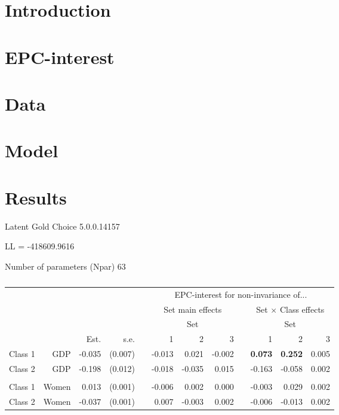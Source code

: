 \documentclass[letterpaper,12pt]{article}
\begin{document}
\section{Introduction}

\noindent


\section{EPC-interest}

\section{Data}
\section{Model}
\section{Results}

Latent Gold Choice 5.0.0.14157

LL = -418609.9616

Number of parameters (Npar)	63


\begin{table}
	\begin{tabular}{lrrrrrrrrrrr}
	\hline
		&&&&&\multicolumn{7}{c}{EPC-interest for non-invariance of...}\\
	&&&&&\multicolumn{3}{c}{Set main effects} && \multicolumn{3}{c}{Set $\times$ Class effects}\\
			\hline
		&&&&&\multicolumn{3}{c}{Set} && \multicolumn{3}{c}{Set}\\
\cline{6-8}\cline{10-12}
			&	&	Est.&	s.e.&	&	1  &	2  &	3  &&	  1&	2 &	3\\
				\hline
Class	1&	GDP&	-0.035&	(0.007)&	&	-0.013&	0.021&	-0.002&&	\textbf{0.073}&	\textbf{0.252}&	0.005\\
Class	2&	GDP&	-0.198&	(0.012)&	&	-0.018&	-0.035&	0.015&&	-0.163&	-0.058&	0.002\\
\\
Class	1&	Women&	0.013&	(0.001)&	&	-0.006&	0.002&	0.000&&	-0.003&	0.029&	0.002\\
Class	2&	Women&	-0.037&	(0.001)&	&	0.007&	-0.003&	0.002&&	-0.006&	-0.013&	0.002\\
	\hline
\end{tabular}
	\caption{\label{tab:epc-interest-model1}}
\end{table}
\end{document}
